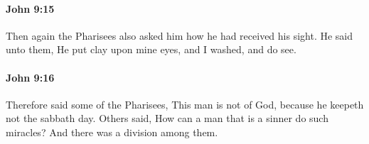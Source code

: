 		\paragraph{John 9:15} %
			\label{JOHN-9-15}

			Then again the Pharisees also asked him how he had received his sight. He said unto them, He put clay upon mine eyes, and I washed, and do see.

			\begin{framed}
			\scriptsize
				\begin{compactdesc}
					\item[SBLG] 
				\end{compactdesc}
			\end{framed}

		\paragraph{John 9:16} %
			\label{JOHN-9-16}

			Therefore said some of the Pharisees, This man is not of God, because he keepeth not the sabbath day. Others said, How can a man that is a sinner do such miracles? And there was a division among them.

